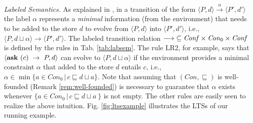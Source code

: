 \documentclass[copyright,creativecommons]{eptcs}
\newcommand{\askp}[2]{\ask \  #1 \  \rightarrow \ #2}
\newcommand{\ask}{{\bf ask}}
\newcommand{\rrarrow}{\longrightarrow}
\newcommand{\Con}{\mathit{Con}}
\newcommand{\pairccp}[2]{\langle #1,#2 \rangle}
\newcommand{\trans}[1]{\stackrel{#1}{\rrarrow}}
\begin{document}
\emph{Labeled Semantics.} As explained in \cite{Aristizabal:11:FOSSACS}, in a transition of the form
$\pairccp{P}{d} \trans{\alpha} \pairccp{P'}{d'}$ the label $\alpha$
represents a \emph{minimal} information (from the environment)
that needs to be added to the store $d$ to evolve from  $\pairccp{P}{d}$ into $\pairccp{P'}{d'}$, i.e.,
$\pairccp{P}{d \sqcup \alpha} \trans{} \pairccp{P'}{d'}$.
The labeled transition relation $\rrarrow\;\subseteq{\it Conf}\times \Con_0
\times{\it Conf}$ is defined by the rules in Tab. \ref{tab:labsem}.
The rule LR2, for example, says that $\pairccp{\askp{(c)}{P}}{d}$ can evolve to
$\pairccp{P}{d\sqcup \alpha}$ if the environment provides a minimal
constraint $\alpha$ that added to the store $d$ entails $c$, i.e.,
$\alpha \in \min \{a \in \Con_0 \, | \, c \sqsubseteq d \sqcup a
\}$. Note that assuming that $(\Con, \sqsubseteq)$ is well-founded
(Remark \ref{rem:well-founded}) is necessary to guarantee that $\alpha$ exists
whenever $ \{a \in \Con_0 \, | \, c \sqsubseteq d \sqcup a \ \}$ is
not empty.  The other rules are easily seen to realize the above intuition.
Fig. \ref{fig:ltsexample} illustrates the LTSs of our running example.
\end{document}
